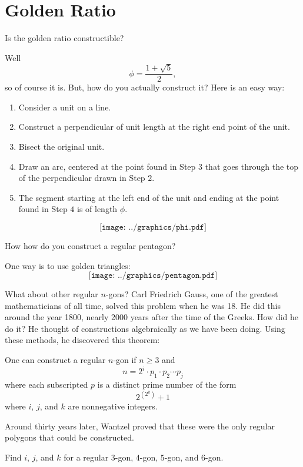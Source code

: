 \newpage
\section{Golden Ratio} %


\begin{ques} Is the golden ratio constructible? 
\end{ques}

Well 
\[
\phi =\frac{1 + \sqrt{5}}{2},
\]
so of course it is. But, how do you actually construct it? Here is an easy way:

\begin{con} \hfill
\begin{enumerate}
\item Consider a unit on a line.
\item Construct a perpendicular of unit length at the right end point of the unit.
\item Bisect the original unit.
\item Draw an arc, centered at the point found in Step $3$ that goes 
through the top of the perpendicular drawn in Step $2$.
\item The segment starting at the left end of the unit and ending at the point found in Step $4$ is of length $\phi$.
\end{enumerate}
\[
\texttt{[image: ../graphics/phi.pdf]}
\]
\end{con}


\begin{ques}How how do you construct a regular pentagon? 
\end{ques}
One way is to use golden triangles:
\[
\texttt{[image: ../graphics/pentagon.pdf]}
\]

What about other regular $n$-gons?  Carl
Friedrich Gauss, one of the greatest mathematicians of all time,
solved this problem when he was 18. He did this around the year 1800,
nearly 2000 years after the time of the Greeks.  How did he do it?  He
thought of constructions algebraically as we have been doing. Using
these methods, he discovered this theorem:


\begin{thm}[Gauss]\label{T:gauss}  One can construct a regular $n$-gon if $n\ge 3$ and 
\[
n= 2^i \cdot p_1\cdot p_2\cdots p_j
\]
where each subscripted $p$ is a distinct prime number of the form
\[
2^{(2^k)}+1
\]
where  $i$, $j$, and $k$ are nonnegative integers.
\end{thm}

Around thirty years later, Wantzel proved that
these were the only regular polygons that could be constructed.

\begin{ques} Find $i$, $j$, and $k$ for a regular $3$-gon, $4$-gon, $5$-gon, and $6$-gon.
\end{ques}
\QM
